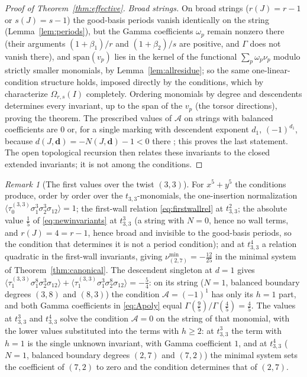 \documentclass[11pt]{amsart}
\theoremstyle{definition}
\theoremstyle{remark}
\newtheorem{remark}[theorem]{Remark}
\newcommand{\Ascr}{\mathcal{A}}
\newcommand{\Om}{\Omega_{r,s}}
\begin{document}
\begin{proof}[Proof of Theorem~\ref{thm:effective}]
\emph{Broad strings.}
On broad
strings ($r(J)=r-1$ or $s(J)=s-1$) the good-basis periods vanish identically
on the string (Lemma~\ref{lem:periods}), but the Gamma coefficients $\omega_p$
remain nonzero there (their arguments $(1+\beta_1)/r$ and $(1+\beta_2)/s$ are
positive, and $\Gamma$ does not vanish there), and $\mathrm{span}(v_{p})$ lies in the
kernel of the functional $\sum_p\omega_p\nu_p$ modulo strictly smaller monomials, by
Lemma~\ref{lem:allresidue}; so the same
one-linear-condition structure holds, imposed directly by the conditions,
which by \cite[Cor.~5.14]{GKT} characterize $\Om(I)$ completely. Ordering monomials by degree and descendents determines every
invariant, up to the span of the $v_{p}$ (the torsor directions), proving the
theorem.  The prescribed values of $\Ascr$ on strings with balanced
coefficients are $0$ or, for a single marking with descendent exponent
$d_1$, $(-1)^{d_1}$, because
$d(J,\mathbf d)=-N(J,\mathbf d)-1<0$ there \cite[Def.~4.8]{GKT}; this proves
the last statement.  The open topological recursion \cite[Thm.~0.5]{GKT}
then relates these invariants to the closed extended invariants; it is not
among the conditions.
\end{proof}

\begin{remark}[The first values over the twist $(3,3)$]
\label{rem:tower}
For $x^{5}+y^{5}$ the conditions produce, order by order over the
$t_{3,3}$-monomials, the one-insertion normalization
$\langle\tau_{0}^{(3,3)}\sigma_{1}^{3}\sigma_{2}^{3}\sigma_{12}\rangle=1$; the
first-wall relation \eqref{eq:firstwallrel} at $t_{3,3}^{2}$; the absolute value
$\tfrac15$ of \eqref{eq:newinvariants} at $t_{3,3}^{3}$ (a string with $N=0$,
hence no wall terms, and $r(J)=4=r{-}1$, hence broad and invisible to the good-basis
periods, so the condition that determines it is not a period condition); and at $t_{3,3}^{4}$
a relation quadratic in the first-wall invariants, giving
$\nu^{\min}_{(2,7)}=-\tfrac{12}{25}$ in the minimal system of
Theorem~\ref{thm:canonical}. The descendent singleton at $d=1$ gives
$\langle\tau_{1}^{(3,3)}\sigma_{1}^{8}\sigma_{2}^{3}\sigma_{12}\rangle
+\langle\tau_{1}^{(3,3)}\sigma_{1}^{3}\sigma_{2}^{8}\sigma_{12}\rangle
=-\tfrac54$: on its string ($N=1$, balanced boundary degrees $(3,8)$ and $(8,3)$)
the condition $\Ascr=(-1)^1$ has only its $h=1$ part, and both Gamma
coefficients in \eqref{eq:Apoly} equal $\Gamma(\tfrac95)/\Gamma(\tfrac45)=\tfrac45$.  The
values at $t_{3,3}^{3}$ and $t_{3,3}^{4}$ solve the condition $\Ascr=0$ on the
string of that monomial, with the lower values substituted into the terms
with $h\ge2$: at $t_{3,3}^{3}$ the term with $h=1$ is the single unknown
invariant, with Gamma coefficient $1$, and at $t_{3,3}^{4}$ ($N=1$, balanced boundary
degrees $(2,7)$ and $(7,2)$) the minimal system sets the coefficient of
$(7,2)$ to zero and the condition determines that of $(2,7)$.
\end{remark}
\end{document}
